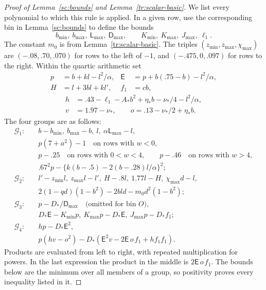 \begin{proof}[Proof of Lemma~\ref{sc:bounds} and Lemma~\ref{tr:scalar-basic}]
We list every polynomial to which this rule is applied. In a given row,
use the corresponding bin in Lemma~\ref{sc:bounds} to define the bounds
\[
 b_{\min},\ b_{\max},\ \mathsf L_{\max},\ \mathsf D_{\max},\qquad
 K_{\min},\ K_{\max},\ J_{\max},\ \ell_1.
\]
The constant $m_0$ is from Lemma~\ref{tr:scalar-basic}.
The triples $(z_{\min},z_{\max},\chi_{\max})$ are
$(-.08,.70,.070)$ for rows to the left of $-1$, and
$(-.475,0,.097)$ for rows to the right. Within the quartic arithmetic set
\[
 \begin{aligned}
 p&=b+kl-l^2/\alpha,&
 \mathsf E&=p+b(.75-b)-l^2/\alpha,\\
 H&=l+3bl+kl',& f_1&=cb,
 \end{aligned}
\]
\[
 \begin{aligned}
 h&=.43-\ell_1-A_*b^2+\eta_*b-\nu_*/4-l^2/\alpha,\\
 v&=1.97-\nu_*,\qquad o=.13-\nu_*/2+\eta_*b.
 \end{aligned}
\]
The four groups are as follows:
\begin{align*}
 \mathcal G_1:\quad& b-b_{\min},\ b_{\max}-b,\ l,\
       \alpha\mathsf L_{\max}-l,\\
 &p(7+a^2)-1\quad\text{on rows with }w<0,\\
 &p-.25\quad\text{on rows with }0<w<4,\qquad
   p-.46\quad\text{on rows with }w>4,\\
 &.67^2p-\{k(b-.5)-2(b-.28)l/\alpha\}^2;\\[1mm]
 \mathcal G_2:\quad& l'-z_{\min}l,\ z_{\max}l-l',\
       H-.8l,\ 1.77l-H,\ \chi_{\max}d-l,\\
 &2(1-qd)(1-b^2)-2bld-m_0d^2(1-b^2);\\[1mm]
 \mathcal G_3:\quad& p-D_*/\mathsf D_{\max}\quad
                         \text{(omitted for bin }O\text{)},\\
 &D_*\mathsf E-K_{\min}p,\ K_{\max}p-D_*\mathsf E,\
       J_{\max}p-D_*f_1;\\[1mm]
 \mathcal G_4:\quad& hp-D_*\mathsf E^2,\\
 &p(hv-o^2)-D_*(\mathsf E^2v-2\mathsf E\,o\,f_1+h f_1 f_1).
\end{align*}
Products are evaluated from left to right, with repeated multiplication
for powers. In the last expression the product in the middle is
$2\mathsf E\,o\,f_1$. The bounds below are the minimum over all members
of a group, so positivity proves every inequality listed in it.


\end{proof}
